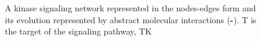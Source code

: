 \documentclass{llncs}
\begin{document}
\begin{figure}[htbp]
\caption{A kinase signaling network represented in the nodes-edges form {\bf\protect{}}
and its evolution represented by abstract molecular interactions
({\bf\protect{}\--{}\protect{}}).
{\sf T} is the target of the signaling pathway, {\sf TK}
}
\end{figure}
\end{document}
